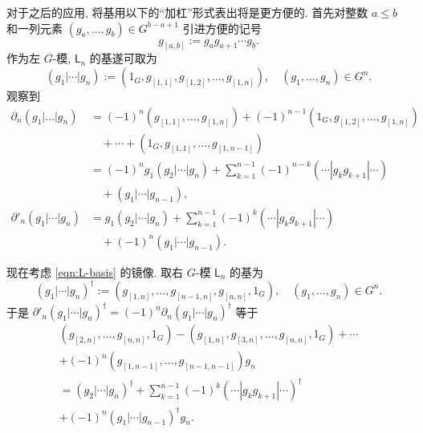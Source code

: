对于之后的应用, 将基用以下的``加杠''形式表出将是更方便的. 首先对整数 $a \leq b$ 和一列元素 $(g_a, \ldots, g_b) \in G^{b-a+1}$ 引进方便的记号
\[ g_{[a, b]} := g_a g_{a+1} \cdots g_b. \]
作为左 $G$-模, $\mathsf{L}_n$ 的基遂可取为
\begin{equation}\label{eqn:L-basis}
	(g_1 | \cdots | g_n) := \left( 1_G, g_{[1, 1]}, g_{[1, 2]}, \ldots, g_{[1, n]} \right), \quad (g_1, \ldots, g_n) \in G^n.
\end{equation}
观察到
\begin{equation}\label{eqn:L-basis-partial}\begin{aligned}
	\partial_n (g_1 | \ldots | g_n) & = (-1)^n \left( g_{[1, 1]}, \ldots, g_{[1, n]}\right) + (-1)^{n-1} \left(1_G, g_{[1, 2]}, \ldots, g_{[1, n]}\right) \\
	& \quad + \cdots + \left( 1_G, g_{[1, 1]}, \ldots, g_{[1, n-1]}\right) \\
	& = (-1)^n g_1 (g_2 | \cdots | g_n) + \sum_{k=1}^{n-1} (-1)^{n-k} (\cdots | g_k g_{k+1}| \cdots) \\
	& \quad + (g_1 | \cdots |g_{n-1}), \\
	\partial'_n(g_1 | \cdots | g_n) & = g_1 (g_2 | \cdots | g_n) + \sum_{k=1}^{n-1} (-1)^k (\cdots | g_k g_{k+1}| \cdots) \\
	& \quad + (-1)^n (g_1 | \cdots |g_{n-1}).
\end{aligned}\end{equation}

现在考虑 \eqref{eqn:L-basis} 的镜像. 取右 $G$-模 $\mathsf{L}_n$ 的基为
\begin{equation}\label{eqn:L-basis-right}
	(g_1 | \cdots | g_n)^\dagger := \left( g_{[1, n]}, \ldots, g_{[n-1, n]} , g_{[n, n]}, 1_G \right), \quad (g_1, \ldots, g_n) \in G^n.
\end{equation}
于是 $\partial'_n (g_1 | \cdots | g_n)^\dagger = (-1)^n \partial_n (g_1 | \cdots | g_n)^\dagger$ 等于
\begin{multline}\label{eqn:L-basis-partial-right}
	\left( g_{[2, n]}, \ldots, g_{[n, n]}, 1_G \right) - \left( g_{[1, n]}, g_{[3, n]}, \ldots, g_{[n, n]}, 1_G \right) + \cdots \\
	+ (-1)^n \left( g_{[1, n-1]}, \ldots, g_{[n-1, n-1]} \right) g_n  \\
	= (g_2 | \cdots | g_n)^\dagger + \sum_{k=1}^{n-1} (-1)^k (\cdots | g_k g_{k+1} | \cdots)^\dagger \\
	+ (-1)^n (g_1 | \cdots | g_{n-1})^\dagger g_n.
\end{multline}

